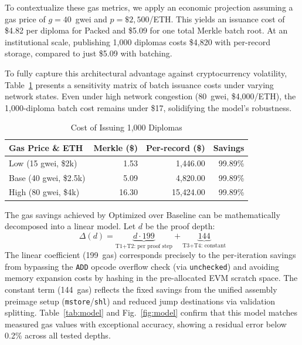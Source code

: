 \documentclass[conference]{IEEEtran}
\renewcommand{\arraystretch}{1.08}
\newcommand{\Vpacked}{Packed}
\newcommand{\Vbase}{Baseline}
\newcommand{\Vopt}{Optimized}
\begin{document}
To contextualize these gas metrics, we apply an economic projection 
assuming a gas price of $g{=}40$~gwei and $p{=}\$2{,}500$/ETH. 
This yields an issuance cost of \$4.82 per diploma for \Vpacked{} 
and \$5.09 for one total Merkle batch root. At an institutional scale, 
publishing 1{,}000 diplomas costs \$4{,}820 with per-record storage, 
compared to just \$5.09 with batching. 

To fully capture this architectural advantage against cryptocurrency volatility, 
Table~\ref{tab:econ} presents a sensitivity matrix of batch issuance costs under 
varying network states. Even under high network congestion (80~gwei, \$4{,}000/ETH), 
the 1{,}000-diploma batch cost remains under \$17, solidifying the model's robustness.

\begin{table}[tbp]
\centering
\caption{Cost of Issuing 1,000 Diplomas}
\label{tab:econ}
\renewcommand{\arraystretch}{1.12}
\footnotesize
\setlength{\tabcolsep}{4.5pt}
\begin{tabular}{@{}lrrr@{}}
\toprule
\textbf{Gas Price \& ETH} & \textbf{Merkle (\$)} & \textbf{Per-record (\$)} & \textbf{Savings} \\
\midrule
Low (15 gwei, \$2k)    & 1.53  & 1{,}446.00  & 99.89\% \\
Base (40 gwei, \$2.5k) & 5.09  & 4{,}820.00  & 99.89\% \\
High (80 gwei, \$4k)   & 16.30 & 15{,}424.00 & 99.89\% \\
\bottomrule
\end{tabular}
\end{table}

The gas savings achieved by \Vopt{} over \Vbase{} can be mathematically 
decomposed into a linear model. Let $d$ be the proof depth:
\begin{equation}
\Delta(d) =
  \underbrace{d \cdot 199}_{\text{T1+T2: per proof step}}
  +\underbrace{144}_{\text{T3+T4: constant}}
\label{eq:model}
\end{equation}
The linear coefficient (199~gas) corresponds precisely to the per-iteration 
savings from bypassing the \texttt{ADD} opcode overflow check (via \texttt{unchecked}) 
and avoiding memory expansion costs by hashing in the pre-allocated EVM scratch space. 
The constant term (144~gas) reflects the fixed savings from the unified assembly 
preimage setup (\texttt{mstore}/\texttt{shl}) and reduced jump destinations via 
validation splitting. Table~\ref{tab:model} and Fig.~\ref{fig:model} confirm that 
this model matches measured gas values with exceptional accuracy, showing a residual 
error below 0.2\% across all tested depths.
\end{document}
